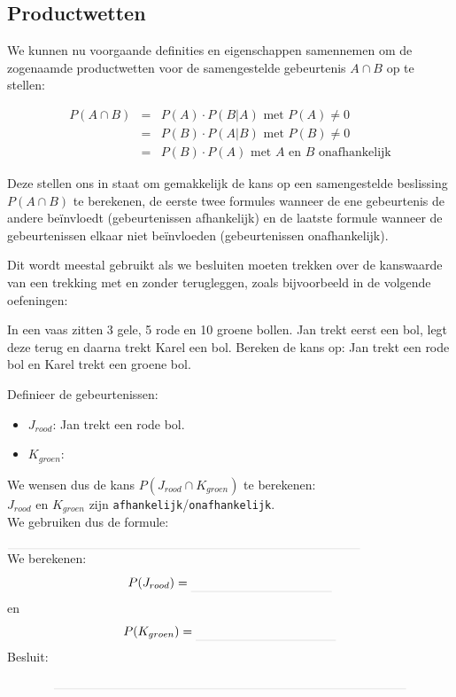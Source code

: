 \documentclass[12pt,twoside]{article}
\begin{document}
\subsection{Productwetten}

We kunnen nu voorgaande definities en eigenschappen samennemen om de zogenaamde productwetten voor de samengestelde gebeurtenis $A\cap B$ op te stellen:\\

\begin{mdframed}\vspace*{-0.5cm}
\begin{eqnarray*}
  P(A\cap B) &=& P(A)\cdot P(B|A) \mbox{ met } P(A)\neq 0\\
             &=& P(B)\cdot P(A|B) \mbox{ met } P(B)\neq 0\\
             &=& P(B)\cdot P(A) \mbox{ met $A$ en $B$ onafhankelijk}
\end{eqnarray*}
\end{mdframed}

Deze stellen ons in staat om gemakkelijk de kans op een samengestelde beslissing $P(A\cap B)$ te berekenen, de eerste twee formules wanneer de ene gebeurtenis de andere beïnvloedt (gebeurtenissen afhankelijk) en de laatste formule wanneer de gebeurtenissen elkaar niet beïnvloeden (gebeurtenissen onafhankelijk).

Dit wordt meestal gebruikt als we besluiten moeten trekken over de kanswaarde van een trekking met en zonder terugleggen, zoals bijvoorbeeld in de volgende oefeningen:

\begin{oefening}
In een vaas zitten 3 gele, 5 rode en 10 groene bollen. Jan trekt eerst een bol, legt deze terug en daarna trekt Karel een bol. Bereken de kans op: Jan trekt een rode bol en Karel trekt een groene bol.

Definieer de gebeurtenissen:
\begin{itemize}
  \itemsep0.1em
  \item $J_{rood}$: Jan trekt een rode bol.
  \item $K_{groen}$: \arulefill
\end{itemize}
\vspace*{0.5cm}
We wensen dus de kans $P(J_{rood}\cap K_{groen})$ te berekenen:\\
$J_{rood}$ en $K_{groen}$ zijn \verb#afhankelijk#/\verb#onafhankelijk#.\\
We gebruiken dus de formule:
$\arule{10cm}$\\
We berekenen:
$$P(J_{rood})=\arule{4cm}$$
en
$$P(K_{groen})=\arule{4cm}$$
Besluit:
$$\arule{10cm}$$
\end{oefening}
\end{document}

